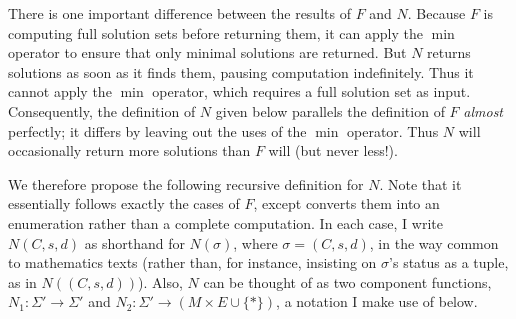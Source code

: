 \documentclass{article}
\begin{document}
There is one important difference between the results of $F$ and $N$.  Because $F$ is computing full solution sets before returning them, it can apply the $\min$ operator to ensure that only minimal solutions are returned.  But $N$ returns solutions as soon as it finds them, pausing computation indefinitely.  Thus it cannot apply the $\min$ operator, which requires a full solution set as input.  Consequently, the definition of $N$ given below parallels the definition of $F$ \emph{almost} perfectly; it differs by leaving out the uses of the $\min$ operator.  Thus $N$ will occasionally return more solutions than $F$ will (but never less!).

We therefore propose the following recursive definition for $N$.  Note that it essentially follows exactly the cases of $F$, except converts them into an enumeration rather than a complete computation.  In each case, I write $N(C,s,d)$ as shorthand for $N(\sigma)$, where $\sigma=(C,s,d)$, in the way common to mathematics texts (rather than, for instance, insisting on $\sigma$'s status as a tuple, as in $N((C,s,d))$).  Also, $N$ can be thought of as two component functions, $N_1:\Sigma'\to\Sigma'$ and $N_2:\Sigma'\to(M\times E\cup\{*\})$, a notation I make use of below.
\end{document}
